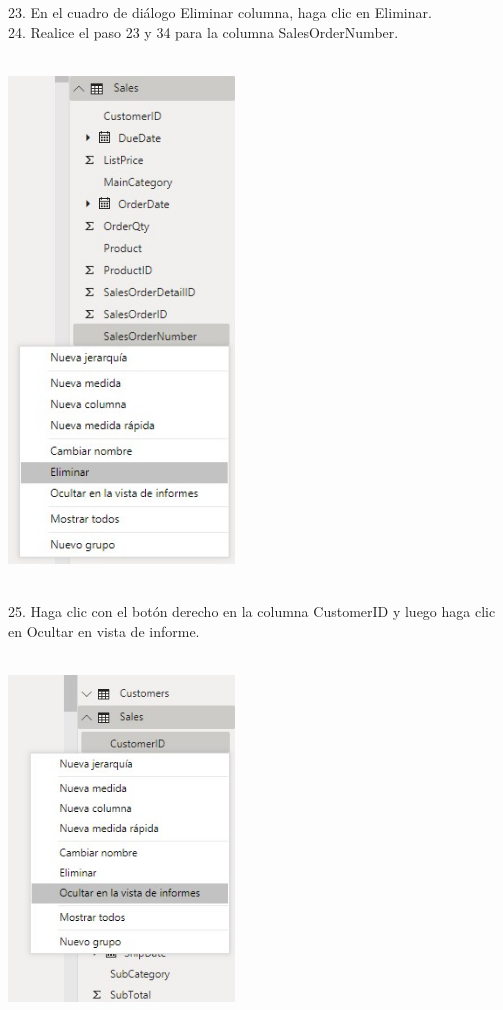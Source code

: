 \documentclass[12pt,letterpaper]{article}
\begin{document}
\begin{flushleft}
\begin{itemize}
23. En el cuadro de diálogo Eliminar columna, haga clic en Eliminar.\\
24. Realice el paso 23 y 34 para la columna SalesOrderNumber.\\
\textbf{ }\\
\begin{center}
	\includegraphics[width=6cm]{./Imagenes/image19} 
	\end{center}
\textbf{ }\\

25. Haga clic con el botón derecho en la columna CustomerID y luego haga clic en Ocultar en vista de informe.\\
\textbf{ }\\
\begin{center}
	\includegraphics[width=6cm]{./Imagenes/image20} 
	\end{center}
\textbf{ }\\


\end{itemize}
\end{flushleft}
\end{document}
